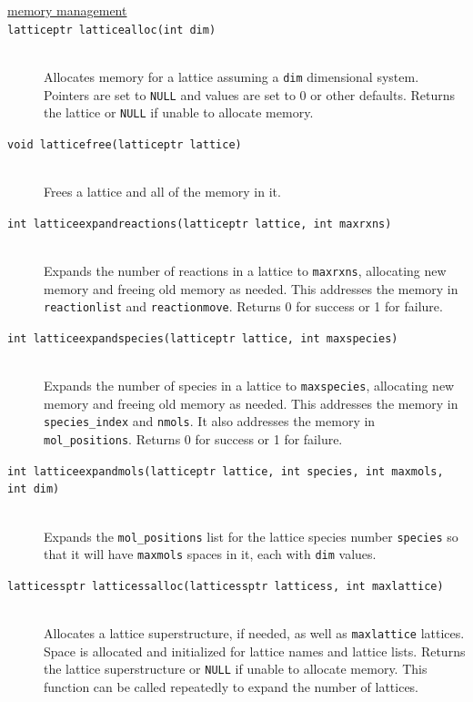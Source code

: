 \documentclass {scrbook}
\newcommand {\ttt} {\texttt}
\begin{document}
\begin{description}

\item[\underline{memory management}]

\item[\ttt{latticeptr latticealloc(int dim)}]
\hfill \\
Allocates memory for a lattice assuming a \ttt{dim} dimensional system. Pointers are set to \ttt{NULL} and values are set to 0 or other defaults. Returns the lattice or \ttt{NULL} if unable to allocate memory.

\item[\ttt{void latticefree(latticeptr lattice)}]
\hfill \\
Frees a lattice and all of the memory in it.

\item[\ttt{int latticeexpandreactions(latticeptr lattice, int maxrxns)}]
\hfill \\
Expands the number of reactions in a lattice to \ttt{maxrxns}, allocating new memory and freeing old memory as needed. This addresses the memory in \ttt{reactionlist} and \ttt{reactionmove}. Returns 0 for success or 1 for failure.

\item[\ttt{int latticeexpandspecies(latticeptr lattice, int maxspecies)}]
\hfill \\
Expands the number of species in a lattice to \ttt{maxspecies}, allocating new memory and freeing old memory as needed. This addresses the memory in \ttt{species\_index} and \ttt{nmols}. It also addresses the memory in \ttt{mol\_positions}. Returns 0 for success or 1 for failure.

\item[\ttt{int latticeexpandmols(latticeptr lattice, int species, int maxmols, int dim)}]
\hfill \\
Expands the \ttt{mol\_positions} list for the lattice species number \ttt{species} so that it will have \ttt{maxmols} spaces in it, each with \ttt{dim} values.

\item[\ttt{latticessptr latticessalloc(latticessptr latticess, int maxlattice)}]
\hfill \\
Allocates a lattice superstructure, if needed, as well as \ttt{maxlattice} lattices. Space is allocated and initialized for lattice names and lattice lists. Returns the lattice superstructure or \ttt{NULL} if unable to allocate memory. This function can be called repeatedly to expand the number of lattices.


\end{description}
\end{document}
